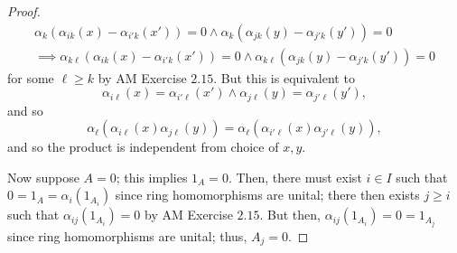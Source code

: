 \documentclass[12pt,letterpaper]{article}
\theoremstyle{definition}
\theoremstyle{remark}
\numberwithin{figure}{problem}
\numberwithin{equation}{section}
\begin{document}
\begin{proof}
\begin{multline*}
    \alpha_{k}(\alpha_{ik}(x) - \alpha_{i'k}(x')) = 0 \land \alpha_{k}(\alpha_{jk}(y) - \alpha_{j'k}(y')) = 0\\
    \implies  \alpha_{k\ell}(\alpha_{ik}(x) - \alpha_{i'k}(x')) = 0 \land \alpha_{k\ell}(\alpha_{jk}(y) - \alpha_{j'k}(y')) = 0
  \end{multline*}
  for some $\ell \geqslant k$ by AM Exercise $2.15$. But this is equivalent to
  \begin{equation*}
    \alpha_{i\ell}(x) = \alpha_{i'\ell}(x') \land \alpha_{j\ell}(y) = \alpha_{j'\ell}(y'),
  \end{equation*}
  and so
  \begin{equation*}
    \alpha_{\ell}(\alpha_{i\ell}(x)\alpha_{j\ell}(y)) = \alpha_{\ell}(\alpha_{i'\ell}(x)\alpha_{j'\ell}(y)),
  \end{equation*}
  and so the product is independent from choice of $x,y$.
  \par Now suppose $A=0$; this implies $1_A = 0$. Then, there must exist $i \in I$ such that $0 = 1_A = \alpha_i(1_{A_i})$ since ring homomorphisms are unital; there then exists $j \geqslant i$ such that $\alpha_{ij}(1_{A_i}) = 0$ by AM Exercise $2.15$. But then, $\alpha_{ij}(1_{A_i}) = 0 = 1_{A_j}$ since ring homomorphisms are unital; thus, $A_j = 0$.
\end{proof}
\end{document}
